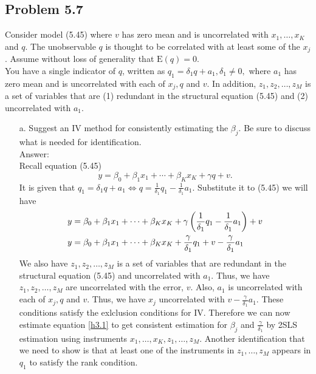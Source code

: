 \documentclass[10pt]{article}
\newcommand{\E}{\text{E}}
\begin{document}
\subsection*{Problem 5.7}
Consider model (5.45) where $v$ has zero mean and is uncorrelated with $x_1,\ldots,x_K$ and $q$. The unobservable $q$ is thought to be correlated with at least some of the $x_j$. Assume without loss of generality that $\E(q)=0.$\\
You have a single indicator of $q$, written as $q_1=\delta_1q+a_1,\delta_1\neq 0,$ where $a_1$ has zero mean and is uncorrelated with each of $x_j,q$ and $v$. In addition, $z_1,z_2,\ldots,z_M$ is a set of variables that are (1) redundant in the structural equation (5.45) and (2) uncorrelated with $a_1.$
\begin{enumerate}
\item[a.] Suggest an IV method for consistently estimating the $\beta_j.$ Be sure to discuss what is needed for identification.
\\ Answer:\\
Recall equation (5.45)
\[y=\beta_0+\beta_1x_1+\cdots+\beta_Kx_K+\gamma q+v.\]
It is given that $q_1=\delta_1q+a_1 \Leftrightarrow q=\frac{1}{\delta_1}q_1-\frac{1}{\delta_1}a_1$. Substitute it to (5.45) we will have
\begin{align}
    y&=\beta_0+\beta_1x_1+\cdots+\beta_Kx_K+\gamma \left(\frac{1}{\delta_1}q_1-\frac{1}{\delta_1}a_1\right)+v \notag \\
    y&=\beta_0+\beta_1x_1+\cdots+\beta_Kx_K+\frac{\gamma}{\delta_1}q_1+v-\frac{\gamma}{\delta_1}a_1 \label{h3.1}
\end{align}
We also have $z_1,z_2,\ldots,z_M$ is a set of variables that are redundant in the structural equation (5.45) and uncorrelated with $a_1.$ Thus, we have $z_1,z_2,\ldots,z_M$ are uncorrelated with the error, $v$. Also, $a_1$ is uncorrelated with each of $x_j,q$ and $v$. Thus, we have $x_j$ uncorrelated with $v-\frac{\gamma}{\delta_1}a_1.$ These conditions satisfy the exlclusion conditions for IV. Therefore we can now estimate equation \eqref{h3.1} to get consistent estimation for $\beta_j$ and $\frac{\gamma}{\delta_1}$ by 2SLS estimation using instruments $x_1,\ldots,x_K,z_1,\ldots,z_M.$ Another identification that we need to show is that at least one of the instruments in $z_1,\ldots,z_M$ appears in $q_1$ to satisfy the rank condition.


\end{enumerate}
\end{document}
